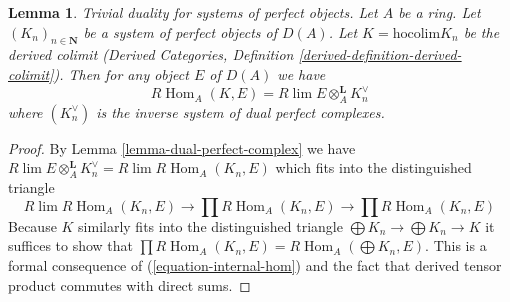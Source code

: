 \documentclass[10pt,a4paper]{amsart}
\theoremstyle{plain}
\newtheorem{lemma}[subsection]{Lemma}
\theoremstyle{definition}
\theoremstyle{remark}
\numberwithin{equation}{subsection}
\def\lim{\mathop{\mathrm{lim}}\nolimits}
\def\Hom{\mathop{\mathrm{Hom}}\nolimits}
\newenvironment{slogan}{\comment}{\endcomment}
\begin{document}
\begin{lemma}
\label{lemma-colim-and-lim-of-duals}
\begin{slogan}
Trivial duality for systems of perfect objects.
\end{slogan}
Let $A$ be a ring. Let $(K_n)_{n \in \mathbf{N}}$ be a system of
perfect objects of $D(A)$. Let $K = \text{hocolim} K_n$ be the derived colimit
(Derived Categories, Definition \ref{derived-definition-derived-colimit}).
Then for any object $E$ of $D(A)$ we have
$$
R\Hom_A(K, E) = R\lim E \otimes^\mathbf{L}_A K_n^\vee
$$
where $(K_n^\vee)$ is the inverse system of dual perfect complexes.
\end{lemma}

\begin{proof}
By Lemma \ref{lemma-dual-perfect-complex} we have
$R\lim E \otimes^\mathbf{L}_A K_n^\vee =
R\lim R\Hom_A(K_n, E)$
which fits into the distinguished triangle
$$
R\lim R\Hom_A(K_n, E) \to
\prod R\Hom_A(K_n, E) \to
\prod R\Hom_A(K_n, E)
$$
Because $K$ similarly fits into the distinguished triangle
$\bigoplus K_n \to \bigoplus K_n \to K$ it suffices to show that
$\prod R\Hom_A(K_n, E) = R\Hom_A(\bigoplus K_n, E)$.
This is a formal consequence of (\ref{equation-internal-hom})
and the fact that derived tensor product commutes with direct sums.
\end{proof}
\end{document}
